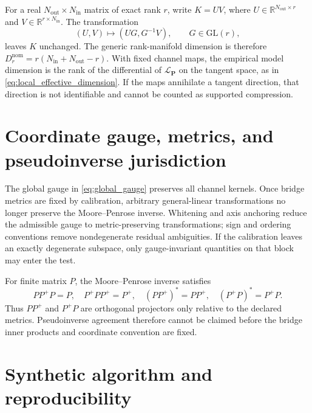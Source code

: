 \documentclass[11pt]{article}
\begin{document}
For a real \(N_{\mathrm{out}}\times N_{\mathrm{in}}\) matrix of exact rank \(r\), write \(K=UV\), where \(U\in\mathbb R^{N_{\mathrm{out}}\times r}\) and \(V\in\mathbb R^{r\times N_{\mathrm{in}}}\). The transformation
\begin{equation}
(U,V)\mapsto(UG,G^{-1}V),
\qquad G\in\mathrm{GL}(r),
\label{eq:rank_factor_gauge}
\end{equation}
leaves \(K\) unchanged. The generic rank-manifold dimension is therefore \(D_r^{\mathrm{nom}}=r(N_{\mathrm{in}}+N_{\mathrm{out}}-r)\). With fixed channel maps, the empirical model dimension is the rank of the differential of \(\mathcal L_{\mathbf P}\) on the tangent space, as in \cref{eq:local_effective_dimension}. If the maps annihilate a tangent direction, that direction is not identifiable and cannot be counted as supported compression.

\section{Coordinate gauge, metrics, and pseudoinverse jurisdiction}

The global gauge in \cref{eq:global_gauge} preserves all channel kernels. Once bridge metrics are fixed by calibration, arbitrary general-linear transformations no longer preserve the Moore--Penrose inverse. Whitening and axis anchoring reduce the admissible gauge to metric-preserving transformations; sign and ordering conventions remove nondegenerate residual ambiguities. If the calibration leaves an exactly degenerate subspace, only gauge-invariant quantities on that block may enter the test.

For finite matrix \(P\), the Moore--Penrose inverse satisfies
\begin{equation}
PP^{+}P=P,
\quad
P^{+}PP^{+}=P^{+},
\quad
(PP^{+})^{*}=PP^{+},
\quad
(P^{+}P)^{*}=P^{+}P.
\end{equation}
Thus \(PP^{+}\) and \(P^{+}P\) are orthogonal projectors only relative to the declared metrics. Pseudoinverse agreement therefore cannot be claimed before the bridge inner products and coordinate convention are fixed.

\section{Synthetic algorithm and reproducibility}
\end{document}
